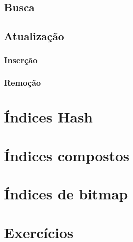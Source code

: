 \subsection{Busca}

\subsection{Atualização}

\subsubsection{Inserção}

\subsubsection{Remoção}

\section{Índices Hash}

\section{Índices compostos}

\section{Índices de bitmap}

\section{Exercícios}

